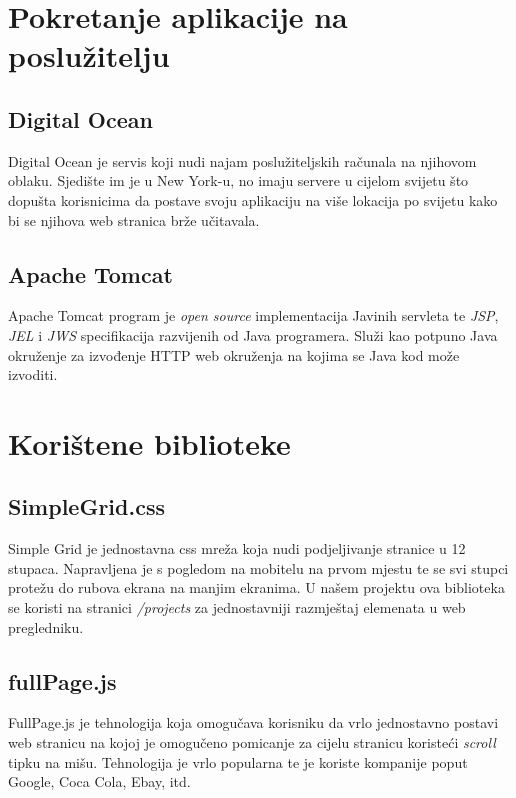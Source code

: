 \documentclass[times, utf8, zavrsni, numeric]{fer}
\begin{document}
\section{Pokretanje aplikacije na poslužitelju}
\subsection{Digital Ocean}
\qquad Digital Ocean je servis koji nudi najam poslužiteljskih računala na njihovom oblaku.
Sjedište im je u New York-u, no imaju servere u cijelom svijetu što dopušta korisnicima da postave svoju aplikaciju na više lokacija po svijetu kako bi se njihova web stranica brže učitavala.
\subsection{Apache Tomcat}
\qquad Apache Tomcat program je \textit{open source} implementacija Javinih servleta te \textit{JSP}\footnotemark{}, \textit{JEL}\footnotemark{} i \textit{JWS}\footnotemark{} specifikacija razvijenih od Java programera.
Služi kao potpuno Java okruženje za izvođenje HTTP web okruženja na kojima se Java kod može izvoditi.

\section{Korištene biblioteke}
\subsection{SimpleGrid.css}
\qquad Simple Grid je jednostavna css mreža koja nudi podjeljivanje stranice u 12 stupaca.
Napravljena je s pogledom na mobitelu na prvom mjestu te se svi stupci protežu do rubova ekrana na manjim ekranima.
U našem projektu ova biblioteka se koristi na stranici \textit{/projects} za jednostavniji razmještaj elemenata u web pregledniku.
\subsection{fullPage.js}
\qquad FullPage.js je tehnologija koja omogučava korisniku da vrlo jednostavno postavi web stranicu na kojoj je omogučeno pomicanje za cijelu stranicu koristeći \textit{scroll} tipku\footnotemark{} na mišu.
Tehnologija je vrlo popularna te je koriste kompanije poput Google, Coca Cola, Ebay, itd.
\end{document}
